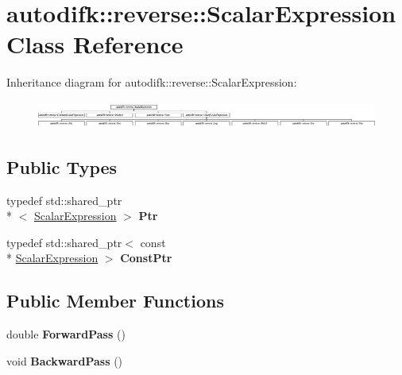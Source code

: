 \hypertarget{classautodifk_1_1reverse_1_1_scalar_expression}{\section{autodifk\-:\-:reverse\-:\-:Scalar\-Expression Class Reference}
\label{classautodifk_1_1reverse_1_1_scalar_expression}
}
Inheritance diagram for autodifk\-:\-:reverse\-:\-:Scalar\-Expression\-:\begin{figure}[H]
\begin{center}
\leavevmode
\includegraphics[height=0.895522cm]{classautodifk_1_1reverse_1_1_scalar_expression}
\end{center}
\end{figure}
\subsection*{Public Types}
\begin{DoxyCompactItemize}
\item 
\hypertarget{classautodifk_1_1reverse_1_1_scalar_expression_a99942f407a198eb41cd3229c0a2b8dc3}{typedef std\-::shared\-\_\-ptr\\*
$<$ \hyperlink{classautodifk_1_1reverse_1_1_scalar_expression}{Scalar\-Expression} $>$ {\bfseries Ptr}}\label{classautodifk_1_1reverse_1_1_scalar_expression_a99942f407a198eb41cd3229c0a2b8dc3}

\item 
\hypertarget{classautodifk_1_1reverse_1_1_scalar_expression_a698d78b9940e968e633a026ee1ef14ec}{typedef std\-::shared\-\_\-ptr$<$ const \\*
\hyperlink{classautodifk_1_1reverse_1_1_scalar_expression}{Scalar\-Expression} $>$ {\bfseries Const\-Ptr}}\label{classautodifk_1_1reverse_1_1_scalar_expression_a698d78b9940e968e633a026ee1ef14ec}

\end{DoxyCompactItemize}
\subsection*{Public Member Functions}
\begin{DoxyCompactItemize}
\item 
\hypertarget{classautodifk_1_1reverse_1_1_scalar_expression_a2fd311a9ed6d6b577e3d8bfa508f778a}{double {\bfseries Forward\-Pass} ()}\label{classautodifk_1_1reverse_1_1_scalar_expression_a2fd311a9ed6d6b577e3d8bfa508f778a}

\item 
\hypertarget{classautodifk_1_1reverse_1_1_scalar_expression_a77e7fb568d55d68da0338e0d9a10d81f}{void {\bfseries Backward\-Pass} ()}\label{classautodifk_1_1reverse_1_1_scalar_expression_a77e7fb568d55d68da0338e0d9a10d81f}

\end{DoxyCompactItemize}
